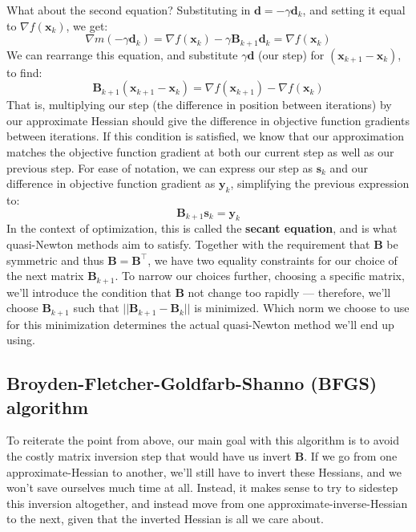 \documentclass[12pt]{article}
\begin{document}
What about the second equation? Substituting in \(\mathbf{d} = - \gamma \mathbf{d}_k\), 
and setting it equal to \(\nabla f(\mathbf{x}_k)\), we get:
\[\nabla m(-\gamma \mathbf{d}_{k}) = \nabla f(\mathbf{x}_k) - \gamma \mathbf{B}_{k+1} \mathbf{d}_{k} = \nabla f(\mathbf{x}_k)\]
We can rearrange this equation, and substitute \(\gamma \mathbf{d}\) (our step) for \((\mathbf{x}_{k+1} - \mathbf{x}_k)\), to find:
\[\mathbf{B}_{k+1} (\mathbf{x}_{k+1} - \mathbf{x}_k) = \nabla f(\mathbf{x}_{k+1}) - \nabla f(\mathbf{x}_k)\]
That is, multiplying our step (the difference in position between iterations) by our approximate Hessian should give the difference in
objective function gradients between iterations. If this condition is satisfied, we know that our approximation matches the objective function
gradient at both our current step as well as our previous step. For ease of notation, we can express our step as \(\mathbf{s}_k\) and our difference
in objective function gradient as \(\mathbf{y}_k\), simplifying the previous expression to:
\[\mathbf{B}_{k+1} \mathbf{s}_k = \mathbf{y}_k\]
In the context of optimization, this is called the \textbf{secant equation}, and is what quasi-Newton methods aim to satisfy.
Together with the requirement that \(\mathbf{B}\) be symmetric and thus \(\mathbf{B} = \mathbf{B}^\top\), we have two equality constraints
for our choice of the next matrix \(\mathbf{B}_{k+1}\). To narrow our choices further, choosing a specific matrix, we'll introduce the condition
that \(\mathbf{B}\) not change too rapidly --- therefore, we'll choose \(\mathbf{B}_{k+1}\) such that 
\(||\mathbf{B}_{k+1} - \mathbf{B}_k||\) is minimized. Which norm we choose to use for this minimization determines the actual quasi-Newton method
we'll end up using.

\subsection{Broyden-Fletcher-Goldfarb-Shanno (BFGS) algorithm}

To reiterate the point from above, our main goal with this algorithm is to avoid the costly matrix inversion step that would have us 
invert \(\mathbf{B}\). If we go from one approximate-Hessian to another, we'll still have to invert these Hessians, and we won't save 
ourselves much time at all. Instead, it makes sense to try to sidestep this inversion altogether, and instead move from one
approximate-inverse-Hessian to the next, given that the inverted Hessian is all we care about. 
\end{document}
